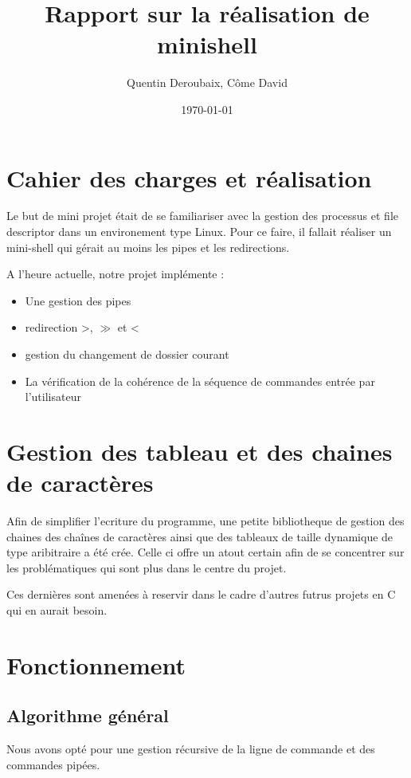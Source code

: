 \documentclass[fr]{article}
\begin{document}
\date{\today}

\title{Rapport sur la réalisation de minishell}
\author{Quentin Deroubaix, Côme David}
\maketitle

\section{Cahier des charges et réalisation}
Le but de mini projet était de se familiariser avec la gestion des
processus et file descriptor dans un environement type Linux. Pour ce
faire, il fallait réaliser un mini-shell qui gérait au moins les pipes
et les redirections.


A l'heure actuelle, notre projet implémente :

\begin{itemize}
\item Une gestion des pipes  
\item redirection >, $\gg$ et <
\item gestion du changement de dossier courant
\item La vérification de la cohérence de la séquence de commandes
  entrée par l'utilisateur
\end{itemize}

\section{Gestion des tableau et des chaines de caractères}
Afin de simplifier l'ecriture du programme, une petite bibliotheque de
gestion des chaines des chaînes de caractères ainsi que des tableaux
de taille dynamique de type aribitraire a été crée. 
Celle ci offre un atout certain afin de se concentrer sur les
problématiques qui sont plus dans le centre du projet.

Ces dernières sont amenées à reservir dans le cadre d'autres futrus projets
en C qui en aurait besoin.

\section{Fonctionnement}
\subsection{Algorithme général}
Nous avons opté pour une gestion récursive de la ligne de commande et
des commandes pipées. 
\end{document}
